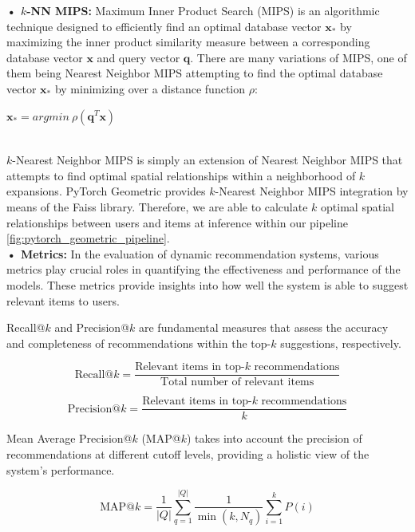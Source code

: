 \documentclass{scrartcl}
\begin{document}
\textbf{• $k$-NN MIPS:} Maximum Inner Product Search (MIPS) is an algorithmic technique designed to efficiently find an optimal database vector $\mathbf{x_{*}}$ by maximizing the inner product similarity measure between a corresponding database vector $\mathbf{x}$ and query vector $\mathbf{q}$. There are many variations of MIPS, one of them being Nearest Neighbor MIPS\cite{nnmips1, nnmips2} attempting to find the optimal database vector $\mathbf{x_{*}}$ by minimizing over a distance function $\rho$: \\ 

\begin{center}
    $\mathbf{x_{*}} = argmin \ \rho(\mathbf{q}^T \mathbf{x})$\\~\\
\end{center}

$k$-Nearest Neighbor MIPS\cite{nnmips3} is simply an extension of Nearest Neighbor MIPS that attempts to find optimal spatial relationships within a neighborhood of $k$ expansions.
PyTorch Geometric provides $k$-Nearest Neighbor MIPS\cite{nnmips3} integration by means of the Faiss library\cite{faiss}. Therefore, we are able to calculate $k$ optimal spatial relationships between users and items at inference within our pipeline \ref{fig:pytorch_geometric_pipeline}. \\ 

\textbf{• Metrics:} In the evaluation of dynamic recommendation systems, various metrics play crucial roles in quantifying the effectiveness and performance of the models. These metrics provide insights into how well the system is able to suggest relevant items to users. 

Recall@$k$ and Precision@$k$ are fundamental measures that assess the accuracy and completeness of recommendations within the top-$k$ suggestions, respectively. 

\[
\text{Recall@}k = \frac{\text{Relevant items in top-} k\text{ recommendations}}{\text{Total number of relevant items}}
\]

\[
\text{Precision@}k = \frac{\text{Relevant items in top-} k\text{ recommendations}}{k}
\]

Mean Average Precision@$k$ (MAP@$k$) takes into account the precision of recommendations at different cutoff levels, providing a holistic view of the system's performance. 

\[
\text{MAP@}k = \frac{1}{|Q|} \sum_{q=1}^{|Q|} \frac{1}{\min(k, N_q)} \sum_{i=1}^k P(i)
\] \\ 
\end{document}
